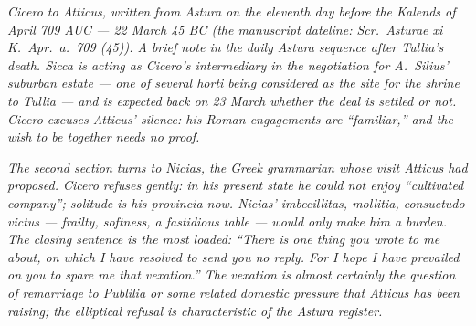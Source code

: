 
\textit{Cicero to Atticus, written from Astura on the
eleventh day before the Kalends of April 709 AUC ---
22 March 45 BC (the manuscript dateline: \textit{Scr.\
Asturae xi K.\ Apr.\ a.\ 709 (45)}). A brief note in
the daily Astura sequence after Tullia's death. Sicca
is acting as Cicero's intermediary in the negotiation
for A.~Silius' suburban estate --- one of several
\textit{horti} being considered as the site for the
shrine to Tullia --- and is expected back on 23 March
whether the deal is settled or not. Cicero excuses
Atticus' silence: his Roman engagements are
``familiar,'' and the wish to be together needs no
proof.}

\textit{The second section turns to Nicias, the
Greek grammarian whose visit Atticus had proposed.
Cicero refuses gently: in his present state he could
not enjoy ``cultivated company''; solitude is his
\textit{provincia} now. Nicias' \textit{imbecillitas},
\textit{mollitia}, \textit{consuetudo victus} ---
frailty, softness, a fastidious table --- would only
make him a burden. The closing sentence is the most
loaded: ``There is one thing you wrote to me about, on
which I have resolved to send you no reply. For I hope
I have prevailed on you to spare me that
vexation.'' The vexation is almost certainly the
question of remarriage to Publilia or some related
domestic pressure that Atticus has been raising; the
elliptical refusal is characteristic of the Astura
register.}
